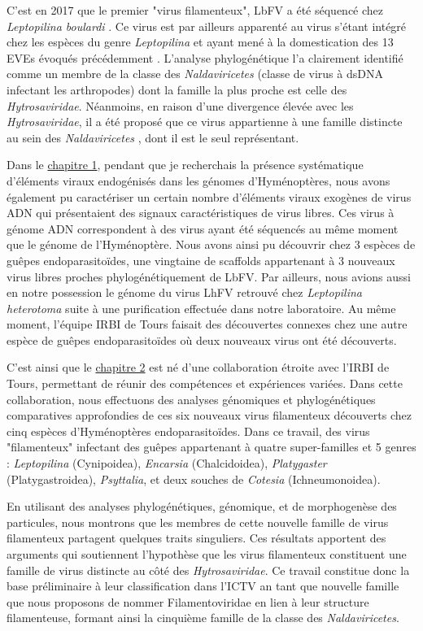 C'est en 2017 que le premier "virus filamenteux", LbFV a été séquencé chez \textit{Leptopilina boulardi} \citep{lepetit_genome_2017}. Ce virus est par ailleurs apparenté au virus s'étant intégré chez les espèces du genre \textit{Leptopilina} et ayant mené à la domestication des 13 EVEs évoqués précédemment \citep{di_giovanni_behavior-manipulating_2020}. L'analyse phylogénétique l'a clairement identifié comme un membre de la classe des \textit{Naldaviricetes} (classe de virus à dsDNA infectant les arthropodes) dont la famille la plus proche est celle des \textit{Hytrosaviridae}. Néanmoins, en raison d'une divergence élevée avec les \textit{Hytrosaviridae}, il a été proposé que ce virus appartienne à une famille distincte au sein des \textit{Naldaviricetes}  \citep{lepetit_genome_2017}, dont il est le seul représentant.

Dans le \hyperref[sec:chap1]{chapitre 1}, pendant que je recherchais la présence systématique d'éléments viraux endogénisés dans les génomes d'Hyménoptères, nous avons également pu caractériser un certain nombre d'éléments viraux exogènes de virus ADN qui présentaient des signaux caractéristiques de virus libres. Ces virus à génome ADN correspondent à des virus ayant été séquencés au même moment que le génome de l'Hyménoptère. Nous avons ainsi pu découvrir chez 3 espèces de guêpes endoparasitoïdes, une vingtaine de scaffolds appartenant à 3 nouveaux virus libres proches phylogénétiquement de LbFV. Par ailleurs, nous avions aussi en notre possession le génome du virus LhFV retrouvé chez \textit{Leptopilina heterotoma} suite à une purification effectuée dans notre laboratoire.  Au même moment, l'équipe IRBI de Tours faisait des découvertes connexes chez une autre espèce de guêpes endoparasitoïdes où deux nouveaux virus ont été découverts.

C'est ainsi que le \hyperref[sec:chap1]{chapitre 2} est né d'une collaboration étroite avec l'IRBI de Tours, permettant de réunir des compétences et expériences variées. Dans cette collaboration, nous effectuons des analyses génomiques et phylogénétiques comparatives approfondies de ces six nouveaux virus filamenteux découverts chez cinq espèces d'Hyménoptères endoparasitoïdes.  Dans ce travail, des virus "filamenteux" infectant des guêpes appartenant à quatre super-familles et 5 genres : \textit{Leptopilina} (Cynipoidea), \textit{Encarsia} (Chalcidoidea), \textit{Platygaster} (Platygastroidea), \textit{Psyttalia}, et deux souches de \textit{Cotesia} (Ichneumonoidea). 

En utilisant des analyses phylogénétiques, génomique, et de morphogenèse des particules, nous montrons que les membres de cette nouvelle famille de virus filamenteux partagent quelques traits singuliers. Ces résultats apportent des arguments qui soutiennent l'hypothèse que les virus filamenteux constituent une famille de virus distincte au côté des \textit{Hytrosaviridae}. Ce travail constitue donc la base préliminaire à leur classification dans l'ICTV an tant que nouvelle famille que nous proposons de nommer Filamentoviridae en lien à leur structure filamenteuse, formant ainsi la cinquième famille de la classe des \textit{Naldaviricetes}.

